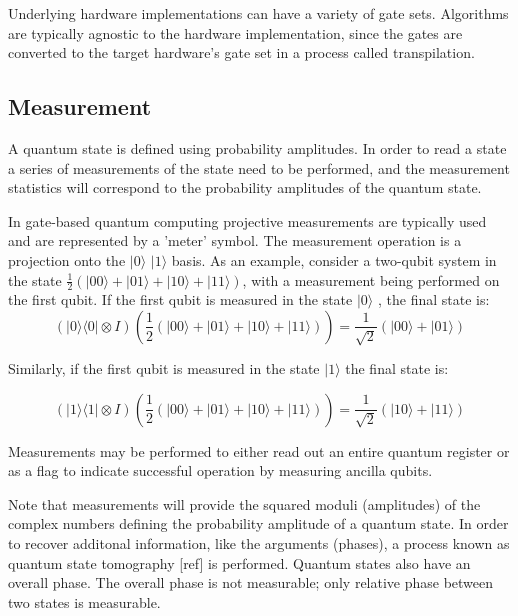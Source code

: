 \documentclass{article}
\begin{document}
Underlying hardware implementations can have a variety of gate sets. Algorithms are typically agnostic to the hardware implementation, since the gates are converted to the target hardware's gate set in a process called transpilation.



\subsection{Measurement}

A quantum state is defined using probability amplitudes. In order to read a state a series of measurements of the state need to be performed, and the measurement statistics will correspond to the probability amplitudes of the quantum state.

In gate-based quantum computing projective measurements are typically used and are represented by a 'meter' symbol. The measurement operation is a projection onto the $ \lvert 0 \rangle $ $ \lvert 1 \rangle $ basis. As an example, consider a two-qubit system in the state $ \frac{1}{2} ( \lvert 00 \rangle + \lvert 01 \rangle + \lvert 10 \rangle + \lvert 11 \rangle )$, with a measurement being performed on the first qubit. If the first qubit is measured in the state $ \lvert 0 \rangle  $ , the final state is:
 \begin{equation}
( \rvert 0 \rangle \langle 0 \rvert \otimes I ) (\frac{1}{2} ( \lvert 00 \rangle + \lvert 01 \rangle + \lvert 10 \rangle + \lvert 11 \rangle ) )
=
\frac{1}{\sqrt{2}} (\lvert 00 \rangle + \lvert 01 \rangle )
\end{equation}

Similarly, if the first qubit is measured in the state $ \lvert 1 \rangle $ the final state is:

 \begin{equation}
( \rvert 1 \rangle \langle 1 \rvert \otimes I ) (\frac{1}{2} ( \lvert 00 \rangle + \lvert 01 \rangle + \lvert 10 \rangle + \lvert 11 \rangle ) )
=
\frac{1}{\sqrt{2}} (\lvert 10 \rangle + \lvert 11 \rangle )
\end{equation}


Measurements may be performed to either read out an entire quantum register or as a flag to indicate successful operation by measuring ancilla qubits.

Note that measurements will provide the squared moduli (amplitudes) of the complex numbers defining the probability amplitude of a quantum state. In order to recover additonal information, like the arguments (phases),  a process known as quantum state tomography [ref] is performed. Quantum states also have an overall phase. The overall phase is not measurable; only relative phase between two states is measurable.
\end{document}
